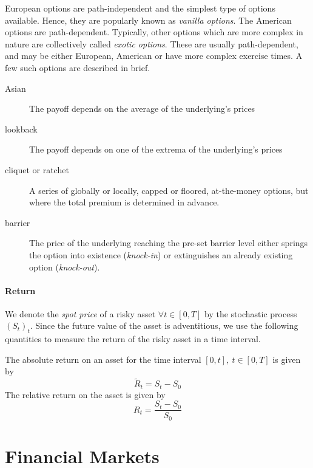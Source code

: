 European options are path-independent and the simplest type of options available. Hence, they are popularly known as \emph{vanilla options}. The American options are path-dependent. Typically, other options which are more complex in nature are collectively called \emph{exotic options}. These are usually path-dependent, and may be either European, American or have more complex exercise times. A few such options are described in brief.
\begin{description}
	\item[Asian] The payoff depends on the average of the underlying's prices
	\item[lookback] The payoff depends on one of the extrema of the underlying's prices
	\item[cliquet or ratchet] A series of globally or locally, capped or floored, at-the-money options, but where the total premium is determined in advance.
	\item[barrier] The price of the underlying reaching the pre-set barrier level either springs the option into existence (\emph{knock-in}) or extinguishes an already existing option (\emph{knock-out}).
\end{description}


\paragraph{Return}
We denote the \emph{spot price} of a risky asset $ \forall t \in [0, T] $ by the stochastic process $ (S_t)_t $. Since the future value of the asset is adventitious, we use the following quantities to measure the return of the risky asset in a time interval.

\begin{dfn}
	The absolute return on an asset for the time interval $ [0, t], \  t \in [0, T] $ is given by
	\begin{equation*}
		\tilde{R}_t = S_t - S_0
	\end{equation*}
	The relative return on the asset is given by
	\begin{equation*}
		R_t = \frac{S_t - S_0}{S_0}
	\end{equation*}	
\end{dfn}



\section{Financial Markets}
\label{sec:intro-market}

